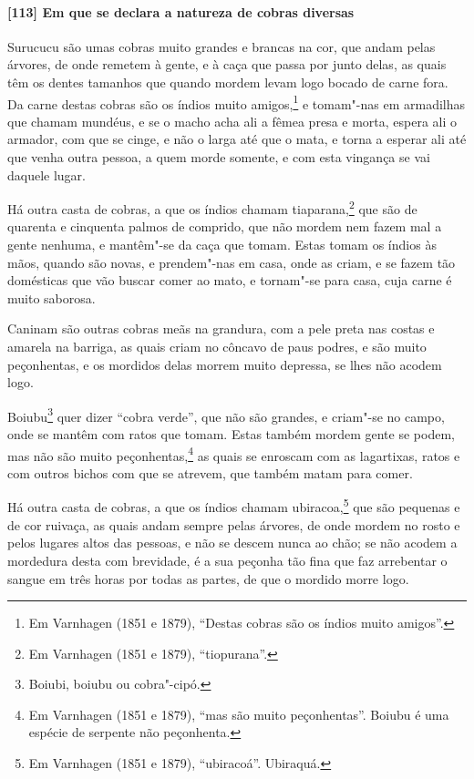 \paragraph{[113] Em que se declara a natureza de cobras diversas}\quad
Surucucu são umas cobras muito grandes e brancas na cor, que andam pelas árvores, de onde
remetem à gente, e à caça que passa por junto delas, as quais têm os dentes tamanhos que
quando mordem levam logo bocado de carne fora. Da carne destas cobras são os índios muito
amigos,\footnote{ Em Varnhagen (1851 e 1879), ``Destas cobras são os índios muito
amigos''.} e tomam"-nas em armadilhas que chamam mundéus, e se o macho acha ali a fêmea
presa e morta, espera ali o armador, com que se cinge, e não o larga até que o mata, e
torna a esperar ali até que venha outra pessoa, a quem morde somente, e com esta vingança
se vai daquele lugar.

Há outra casta de cobras, a que os índios chamam tiaparana,\footnote{ Em Varnhagen (1851 e
1879), ``tiopurana''.} que são de quarenta e cinquenta palmos de comprido, que não mordem
nem fazem mal a gente nenhuma, e mantêm"-se da caça que tomam. Estas tomam os índios às
mãos, quando são novas, e prendem"-nas em casa, onde as criam, e se fazem tão domésticas
que vão buscar comer ao mato, e tornam"-se para casa, cuja carne é muito saborosa.

Caninam são outras cobras meãs na grandura, com a pele preta nas costas e amarela na
barriga, as quais criam no côncavo de paus podres, e são muito peçonhentas, e os mordidos
delas morrem muito depressa, se lhes não acodem logo.

Boiubu\footnote{ Boiubi, boiubu ou cobra"-cipó.} quer dizer ``cobra verde'', que não são
grandes, e criam"-se no campo, onde se mantêm com ratos que tomam. Estas também mordem
gente se podem, mas não são muito peçonhentas,\footnote{ Em Varnhagen (1851 e 1879), ``mas
são muito peçonhentas''. Boiubu é uma espécie de serpente não peçonhenta.} as quais se
enroscam com as lagartixas, ratos e com outros bichos com que se atrevem, que também matam
para comer.

Há outra casta de cobras, a que os índios chamam ubiracoa,\footnote{ Em Varnhagen (1851 e
1879), ``ubiracoá''. Ubiraquá.} que são pequenas e de cor ruivaça, as quais andam sempre
pelas árvores, de onde mordem no rosto e pelos lugares altos das pessoas, e não se descem
nunca ao chão; se não acodem a mordedura desta com brevidade, é a sua peçonha tão fina que
faz arrebentar o sangue em três horas por todas as partes, de que o mordido morre logo.

